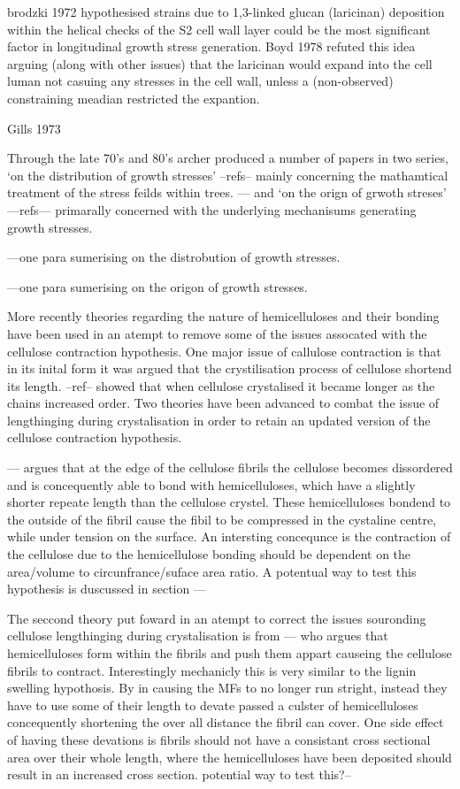 \documentclass{article}
\begin{document}
brodzki 1972 hypothesised strains due to 1,3-linked glucan (laricinan)
deposition within the helical checks of the S2 cell wall layer could be the
most significant factor in longitudinal growth stress generation. Boyd 1978
refuted this idea arguing (along with other issues) that the laricinan would
expand into the cell luman not casuing any stresses in the cell wall, unless a
(non-observed) constraining meadian restricted the expantion.

Gills 1973

Through the late 70's and 80's archer produced a number of papers in two series,
`on the distribution of growth stresses' --refs-- mainly concerning the
mathamtical treatment of the stress feilds within trees. --- and `on the
orign of grwoth streses' ---refs--- primarally concerned with the underlying
mechanisums generating growth stresses.

---one para sumerising on the distrobution of growth stresses.

---one para sumerising on the origon of growth stresses.

More recently theories regarding the nature of hemicelluloses and their bonding
have been used in an atempt to remove some of the issues assocated with the
cellulose contraction hypothesis. One major issue of callulose contraction is
that in its inital form it was argued that the crystilisation process of cellulose
shortend its length. --ref-- showed that when cellulose crystalised it became
longer as the chains increased order. Two theories have been advanced to combat
the issue of lengthinging during crystalisation in order to retain an updated
version of the cellulose contraction hypothesis.

--- argues that at the edge of the cellulose fibrils the cellulose becomes
dissordered and is concequently able to bond with hemicelluloses, which have a
slightly shorter repeate length than the cellulose crystel. These hemicelluloses
bondend to the outside of the fibril cause the fibil to be compressed in the
cystaline centre, while under tension on the surface. An intersting concequnce
is the contraction of the cellulose due to the hemicellulose bonding should be
dependent on the area/volume to circunfrance/suface area ratio. A potentual way
to test this hypothesis is duscussed in section ---

The seccond theory put foward in an atempt to correct the issues souronding
cellulose lengthinging during crystalisation is from --- who argues that
hemicelluloses form within the fibrils and push them appart causeing the
cellulose fibrils to contract. Interestingly mechanicly this is very similar to
the lignin swelling hypothosis. By in causing the MFs to no longer run stright,
instead they have to use some of their length to devate passed a culster of
hemicelluloses concequently shortening the over all distance the fibril can
cover. One side effect of having these devations is fibrils should not have a
consistant cross sectional area over their whole length, where the
hemicelluloses have been deposited should result in an increased cross section.
potential way to test this?--
\end{document}
